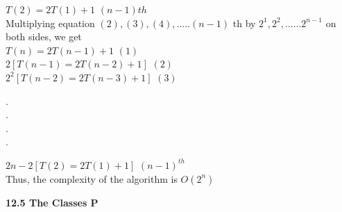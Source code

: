 \documentclass[12pt]{article}
\begin{document}
\hspace*{2cm} $T(2) = 2T(1) + 1$  \hspace*{3cm} $(n - 1)th$ \\

\vspace*{0.1cm}
Multiplying equation $(2), (3), (4), ..... (n - 1)$ th by $2^{1}, 2^{2}, ...... 2^{n - 1}$ on both sides, we get\\

\vspace*{0.1cm}
\hspace*{4cm} $T(n) = 2T(n - 1) + 1$   \hspace*{3cm}  $(1)$ \\
\hspace*{3cm} $2[T(n - 1) = 2T(n - 2) + 1]$ \hspace*{3cm}  $(2)$ \\
\hspace*{3cm} $2^{2}[T(n - 2) = 2T(n - 3) + 1]$ \hspace*{3cm}  $(3)$ \\
\begin{center}
  . \\
  . \\
  . \\
  . \\
\end{center}
\hspace*{2cm}  $2n - 2[T(2) = 2T(1) + 1]$  \hspace*{3cm} $(n - 1)^{th}$ \\

\vspace*{0.1cm}
Thus, the complexity of the algorithm is $O(2^{n})$ \\

\vspace*{0.4cm}

\large{
\textbf{12.5 The Classes P} \\
}
\end{document}
